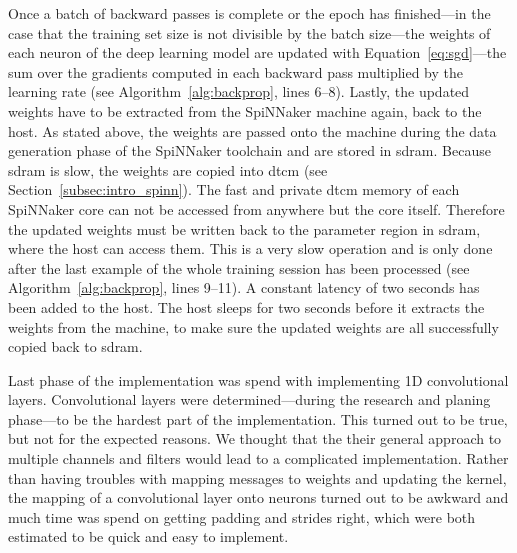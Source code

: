 \documentclass[]{article}
\begin{document}
Once a batch of backward passes is complete or the epoch has
finished---in the case that the training set size is not divisible by
the batch size---the weights of each neuron of the deep learning model
are updated with
Equation~\ref{eq:sgd}---the sum over the gradients computed in each
backward pass multiplied by the learning rate
(see Algorithm~\ref{alg:backprop}, lines 6--8).
Lastly, the updated weights have to be extracted from the SpiNNaker
machine again, back to the host.
As stated above, the weights are passed onto the machine during the
data generation phase of the SpiNNaker toolchain and are stored in
\acrshort{sdram}.
Because \acrshort{sdram} is slow, the weights are copied into \acrshort{dtcm} (see
Section~\ref{subsec:intro_spinn}).
The fast and private \acrshort{dtcm} memory of each SpiNNaker core can not be
accessed from anywhere but the core itself.
Therefore the updated weights must be written back to the parameter
region in \acrshort{sdram}, where the host can access them.
This is a very slow operation and is only done after the last
example of the whole training session has been processed
(see Algorithm~\ref{alg:backprop}, lines 9--11).
A constant latency of two seconds has been added to the host.
The host sleeps for two seconds before it extracts the weights from
the machine, to make sure the updated weights are all successfully
copied back to \acrshort{sdram}.

Last phase of the implementation was spend with implementing 1D
convolutional layers.
Convolutional layers were determined---during the research and planing
phase---to be the hardest part of the implementation.
This turned out to be true, but not for the expected reasons.
We thought that the their general approach to multiple channels and
filters would lead to a complicated implementation.
Rather than having troubles with mapping messages to weights and
updating the kernel, the mapping of a convolutional layer onto neurons
turned out to be awkward and much time was spend on getting padding
and strides right, which were both estimated to be quick and easy to
implement.
\end{document}
